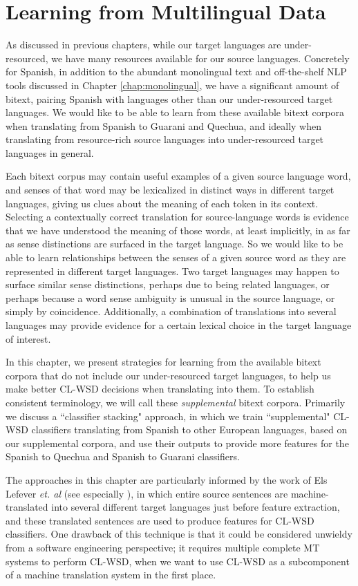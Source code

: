 \chapter{Learning from Multilingual Data}
\label{chap:multilingual}
As discussed in previous chapters, while our target languages are
under-resourced, we have many resources available for our source languages.
Concretely for Spanish, in addition to the abundant monolingual text and
off-the-shelf NLP tools discussed in Chapter \ref{chap:monolingual}, we
have a significant amount of bitext, pairing Spanish with languages other than
our under-resourced target languages. We would like to be able to learn from
these available bitext corpora when translating from Spanish to Guarani and
Quechua, and ideally when translating from resource-rich source languages into
under-resourced target languages in general.

Each bitext corpus may contain useful examples of a given source language word,
and senses of that word may be lexicalized in distinct ways in different target
languages, giving us clues about the meaning of each token in its context.
Selecting a contextually correct translation for source-language words is
evidence that we have understood the meaning of those words, at least
implicitly, in as far as sense distinctions are surfaced in the target
language. So we would like to be able to learn relationships between
the senses of a given source word as they are represented in different target
languages. Two target languages may happen to surface similar sense
distinctions, perhaps due to being related languages, or perhaps because a word
sense ambiguity is unusual in the source language, or simply by coincidence.
Additionally, a combination of translations into several languages may provide
evidence for a certain lexical choice in the target language of interest.

In this chapter, we present strategies for learning from the available bitext
corpora that do not include our under-resourced target languages, to help us
make better CL-WSD decisions when translating into them. To establish
consistent terminology, we will call these \emph{supplemental} bitext corpora.
Primarily we discuss a ``classifier stacking" approach, in which we train
``supplemental" CL-WSD classifiers translating from Spanish to other European
languages, based on our supplemental corpora, and use their outputs 
to provide more features for the Spanish to Quechua and Spanish to
Guarani classifiers.

The approaches in this chapter are particularly informed by the work of Els
Lefever \emph{et. al} (see especially
\cite{lefever-hoste-decock:2011:ACL-HLT2011}), in which entire source sentences
are machine-translated into several different target languages just before
feature extraction, and these translated sentences are used to produce features
for CL-WSD classifiers. One drawback of this technique is that it could be
considered unwieldy from a software engineering perspective; it requires
multiple complete MT systems to perform CL-WSD, when we want to use CL-WSD as a
subcomponent of a machine translation system in the first place.

